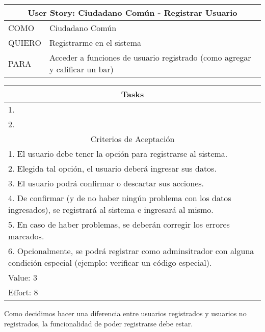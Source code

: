     \begin{table}[H]
        \centering
        \begin{tabular}{| p{1.5cm}| p{10.2cm} |}
            \hline
            \multicolumn{2}{|c|}{User Story: Ciudadano Común - Registrar Usuario} \\
            \hline
            COMO & Ciudadano Común \\ \hline
            QUIERO & Registrarme en el sistema \\ \hline
            PARA & Acceder a funciones de usuario registrado (como agregar y calificar un bar) \\ \hline
            \hline
        \end{tabular}
        \begin{tabular}{| p{12.118cm} |}
            \multicolumn{1}{|c|}{Tasks} \\
            \hline
            1. \\ \hline
            2. \\ \hline
            \hline
            \multicolumn{1}{|c|}{Criterios de Aceptación} \\
            \hline
            1. El usuario debe tener la opción para registrarse al sistema. \\ \hline
            2. Elegida tal opción, el usuario deberá ingresar sus datos. \\ \hline
            3. El usuario podrá confirmar o descartar sus acciones. \\ \hline
            4. De confirmar (y de no haber ningún problema con los datos ingresados), se registrará al sistema e ingresará al mismo. \\ \hline
            5. En caso de haber problemas, se deberán corregir los errores marcados. \\ \hline
            6. Opcionalmente, se podrá registrar como adminsitrador con alguna condición especial (ejemplo: verificar un código especial). \\ \hline
            Value: 3 \\ \hline
            Effort: 8 \\ \hline
        \end{tabular}
    \end{table}
    
     Como decidimos hacer una diferencia entre usuarios registrados y usuarios no registrados, la funcionalidad de poder registrarse debe estar. \\
    
